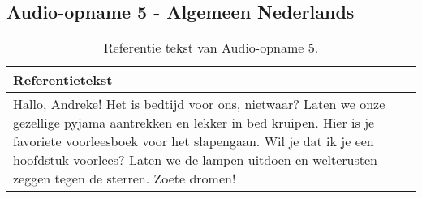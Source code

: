 \subsection{Audio-opname 5 - Algemeen Nederlands}
\begin{table}[htbp]
    \centering
    \label{tab:groundtruth_sample5}
    \begin{tabularx}{\textwidth}{|X|}
        \hline
        \textbf{Referentietekst} \\
        \hline
        Hallo, Andreke! Het is bedtijd voor ons, nietwaar? Laten we onze gezellige pyjama aantrekken en lekker in bed kruipen. Hier is je favoriete voorleesboek voor het slapengaan. Wil je dat ik je een hoofdstuk voorlees? Laten we de lampen uitdoen en welterusten zeggen tegen de sterren. Zoete dromen! \\
        \hline
    \end{tabularx}
        \caption{Referentie tekst van Audio-opname 5.}
\end{table}


